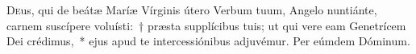 \lettrine{D}{e}us, qui de beátæ Maríæ Vírginis útero Verbum tuum, Angelo nuntiánte, carnem suscípere voluísti:~† præsta supplícibus tuis; ut qui vere eam Genetrícem Dei crédimus,~* ejus apud te intercessiónibus adjuvémur. Per eúmdem Dóminum.